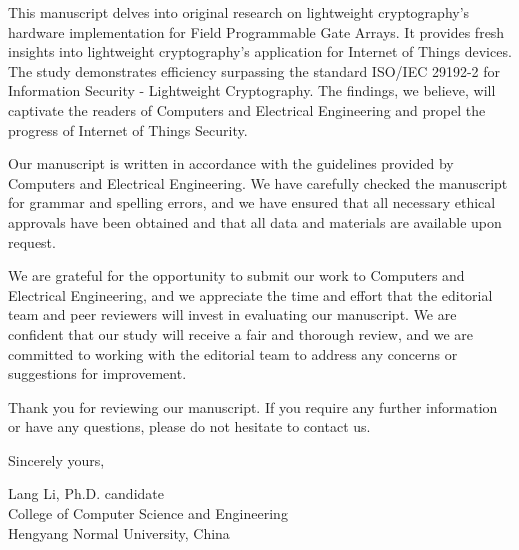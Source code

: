\documentclass{article}
\begin{document}
This manuscript delves into original research on lightweight cryptography's hardware implementation for Field Programmable Gate Arrays. It provides fresh insights into lightweight cryptography's application for Internet of Things devices. The study demonstrates efficiency surpassing the standard ISO/IEC 29192-2 for Information Security - Lightweight Cryptography. The findings, we believe, will captivate the readers of Computers and Electrical Engineering and propel the progress of Internet of Things Security.

Our manuscript is written in accordance with the guidelines provided by Computers and Electrical Engineering. We have carefully checked the manuscript for grammar and spelling errors, and we have ensured that all necessary ethical approvals have been obtained and that all data and materials are available upon request.

We are grateful for the opportunity to submit our work to Computers and Electrical Engineering, and we appreciate the time and effort that the editorial team and peer reviewers will invest in evaluating our manuscript. We are confident that our study will receive a fair and thorough review, and we are committed to working with the editorial team to address any concerns or suggestions for improvement.

Thank you for reviewing our manuscript. If you require any further information or have any questions, please do not hesitate to contact us.

\bigskip %

Sincerely yours,

\vspace{20pt} %


Lang Li, Ph.D. candidate \\
College of Computer Science and Engineering\\
Hengyang Normal University, China \\
\end{document}
